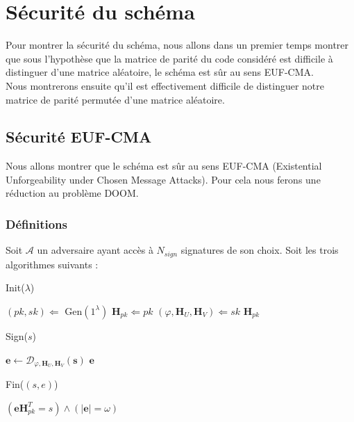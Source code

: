 \documentclass[12pt]{article}
\theoremstyle{plain}
\theoremstyle{definition}
\newcommand{\e}{\mathbf{e}}
\newcommand{\s}{\mathbf{s}}
\begin{document}
\section{Sécurité du schéma}
Pour montrer la sécurité du schéma, nous allons dans un premier temps montrer que sous l'hypothèse que la matrice de parité du code considéré est difficile à distinguer d'une matrice aléatoire, le schéma est sûr au sens EUF-CMA.\\
Nous montrerons ensuite qu'il est effectivement difficile de distinguer notre matrice de parité permutée d'une matrice aléatoire. \\

\subsection{Sécurité EUF-CMA}
Nous allons montrer que le schéma est sûr au sens EUF-CMA (Existential Unforgeability under Chosen Message Attacks). Pour cela nous ferons une réduction au problème DOOM.
\subsubsection{Définitions}

Soit $\mathcal{A}$ un adversaire ayant accès à $N_{sign}$ signatures de son choix. Soit les trois algorithmes suivants :


\begin{algorithm} [h]
	\caption{Init($\lambda$)}
	\begin{algorithmic}[1]
    	\STATE $(pk,sk) \Longleftarrow$ Gen$(1^\lambda)$ 
    	\STATE $\mathbf{H}_{pk} \Longleftarrow pk$
    	\STATE $(\varphi,\mathbf{H}_{U},\mathbf{H}_{V})\Longleftarrow sk$
    	\RETURN $\mathbf{H}_{pk}$
    \end{algorithmic}
\end{algorithm}

\begin{algorithm}[h]
	\caption{Sign($s$)}
	\begin{algorithmic}[1]
    	\STATE $\e \leftarrow \mathcal{D}_{\varphi,\mathbf{H}_{U},\mathbf{H}_{V}}(\s)$
    	\RETURN $\e$
    \end{algorithmic}
\end{algorithm}

\begin{algorithm}[h]
	\caption{Fin($(s,e)$)}
	\begin{algorithmic}[1]
    	\RETURN $(\mathbf{e}\mathbf{H}_{pk}^T = s) \land (|\mathbf{e}| = \omega)$
    \end{algorithmic}
\end{algorithm}
\end{document}
